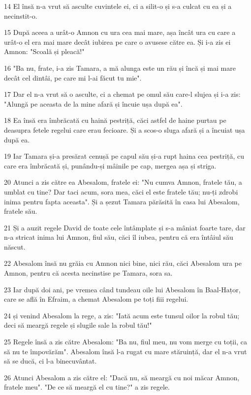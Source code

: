 \par 14 El însă n-a vrut să asculte cuvintele ei, ci a silit-o și s-a culcat cu ea și a necinstit-o.
\par 15 După aceea a urât-o Amnon cu ura cea mai mare, așa încât ura cu care a urât-o el era mai mare decât iubirea pe care o avusese către ea. Și i-a zis ei Amnon: "Scoală și pleacă!"
\par 16 "Ba nu, frate, i-a zis Tamara, a mă alunga este un rău și încă și mai mare decât cel dintâi, pe care mi l-ai făcut tu mie".
\par 17 Dar el n-a vrut să o asculte, ci a chemat pe omul său care-l slujea și i-a zis: "Alungă pe aceasta de la mine afară și încuie ușa după ea".
\par 18 Ea însă era îmbrăcată cu haină pestriță, căci astfel de haine purtau pe deasupra fetele regelui care erau fecioare. Și a scos-o sluga afară și a încuiat ușa după ea.
\par 19 Iar Tamara și-a presărat cenușă pe capul său și-a rupt haina cea pestriță, cu care era îmbrăcată și, punându-și mâinile pe cap, mergea așa și striga.
\par 20 Atunci a zis către ea Abesalom, fratele ei: "Nu cumva Amnon, fratele tău, a umblat cu tine? Dar taci acum, sora mea, căci el este fratele tău; nu-ți zdrobi inima pentru fapta aceasta". Și a șezut Tamara părăsită în casa lui Abesalom, fratele său.
\par 21 Și a auzit regele David de toate cele întâmplate și s-a mâniat foarte tare, dar n-a stricat inima lui Amnon, fiul său, căci îl iubea, pentru că era întâiul său născut.
\par 22 Abesalom însă nu grăia cu Amnon nici bine, nici rău, căci Abesalom ura pe Amnon, pentru că acesta necinstise pe Tamara, sora sa.
\par 23 Iar după doi ani, pe vremea când tundeau oile lui Abesalom în Baal-Hațor, care se află în Efraim, a chemat Abesalom pe toți fiii regelui.
\par 24 și venind Abesalom la rege, a zis: "Iată acum este tunsul oilor la robul tău; deci să meargă regele și slugile sale la robul tău!"
\par 25 Regele însă a zis către Abesalom: "Ba nu, fiul meu, nu vom merge cu toții, ca să nu te împovărăm". Abesalom însă l-a rugat cu mare stăruință, dar el n-a vrut să se ducă, ci l-a binecuvântat.
\par 26 Atunci Abesalom a zis către el: "Dacă nu, să meargă cu noi măcar Amnon, fratele meu". "De ce să meargă el cu tine?" a zis regele.
